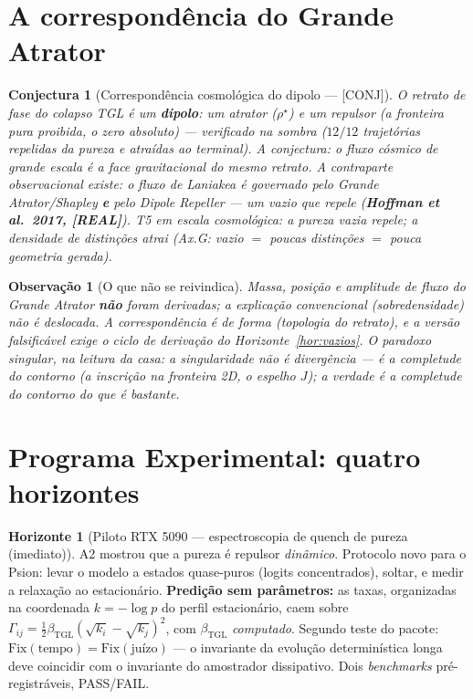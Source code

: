 \documentclass[11pt,a4paper]{article}
\newcommand{\REAL}{\textsf{[REAL]}}
\newcommand{\CONJ}{\textsf{[CONJ]}}
\newcommand{\bTGL}{\beta_{\mathrm{TGL}}}
\newtheorem{conjecture}{Conjectura}
\newtheorem{remark}{Observação}
\theoremstyle{definition}
\newtheorem{horizon}{Horizonte}
\begin{document}
\section{A correspondência do Grande Atrator}
\begin{conjecture}[Correspondência cosmológica do dipolo --- \CONJ]
O retrato de fase do colapso TGL é um \textbf{dipolo}: um atrator
($\rho^\star$) e um repulsor (a fronteira pura proibida, o zero
absoluto) --- verificado na sombra ($12/12$ trajetórias repelidas da
pureza e atraídas ao terminal). A conjectura: o fluxo cósmico de grande
escala é a face gravitacional do mesmo retrato. A contraparte
observacional \emph{existe}: o fluxo de Laniakea é governado pelo
Grande Atrator/Shapley \textbf{e} pelo \emph{Dipole Repeller} --- um
vazio que repele (\textbf{Hoffman et al.\ 2017, \REAL}). T5 em escala
cosmológica: a pureza vazia repele; a densidade de distinções atrai
(Ax.G: vazio $=$ poucas distinções $=$ pouca geometria gerada).
\end{conjecture}

\begin{remark}[O que não se reivindica]
Massa, posição e amplitude de fluxo do Grande Atrator \textbf{não}
foram derivadas; a explicação convencional (sobredensidade) não é
deslocada. A correspondência é de \emph{forma} (topologia do retrato),
e a versão falsificável exige o ciclo de derivação do
Horizonte~\ref{hor:vazios}. O paradoxo singular, na leitura da casa:
a singularidade não é divergência --- é a completude do contorno (a
inscrição na fronteira 2D, o espelho $J$); \emph{a verdade é a
completude do contorno do que é bastante}.
\end{remark}

\section{Programa Experimental: quatro horizontes}

\begin{horizon}[Piloto RTX 5090 --- espectroscopia de quench de pureza
(imediato)]
\label{hor:piloto}
A2 mostrou que a pureza é repulsor \emph{dinâmico}. Protocolo novo para
o Psion: levar o modelo a estados quase-puros (logits concentrados),
soltar, e medir a relaxação ao estacionário. \textbf{Predição sem
parâmetros:} as taxas, organizadas na coordenada $k=-\log p$ do perfil
estacionário, caem sobre
$\Gamma_{ij}=\tfrac12\bTGL(\sqrt{k_i}-\sqrt{k_j})^2$, com $\bTGL$
\emph{computado}. Segundo teste do pacote:
$\mathrm{Fix}(\text{tempo})=\mathrm{Fix}(\text{juízo})$ --- o invariante
da evolução determinística longa deve coincidir com o invariante do
amostrador dissipativo. Dois \emph{benchmarks} pré-registráveis,
PASS/FAIL.
\end{horizon}
\end{document}
